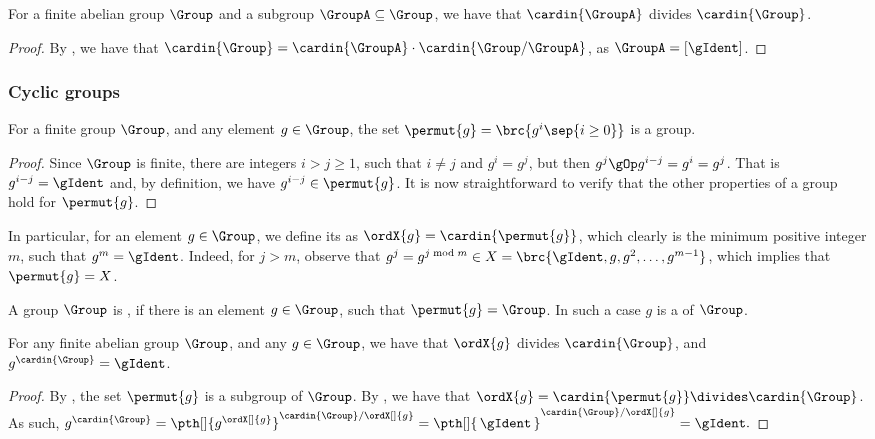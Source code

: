 
\begin{lemma}
    For a finite abelian group $\Group$ and a subgroup $\GroupA
    \subseteq \Group$, we have that $\cardin{\GroupA}$ divides
    $\cardin{\Group}$.
\end{lemma}

\begin{proof}
    By , we have that $\cardin{\Group} =
    \cardin{\GroupA} \cdot \cardin{\Group / \GroupA}$, as $\GroupA =
    [\gIdent]$.
\end{proof}

\subsubsection{Cyclic groups}

\begin{lemma}
    For a finite group $\Group$, and any element $g\in\Group$, 
    the set $\permut{g} = \brc{ g^i \sep{ i\geq 0}}$ is a group.
\end{lemma}

\begin{proof}
    Since $\Group$ is finite, there are integers $i > j\geq 1$, such
    that $i \neq j$ and $g^i = g^j$, but then $g^j\gOp g^{i-j} =g^i =
    g^j$. That is $g^{i-j} = \gIdent$ and, by definition, we have
    $g^{i-j} \in \permut{g}$. It is now straightforward to verify that
    the other properties of a group hold for $\permut{g}$.
\end{proof}


In particular, for an element $g \in \Group$, we define its
 as $\ordX{g} = \cardin{\bigl. \permut{g}}$, which
clearly is the minimum positive integer $m$, such that $g^m =
\gIdent$. Indeed, for $j > m$, observe that $g^j = g^{j \bmod m} \in X
= \brc{ \gIdent, g, g^2, \ldots, g^{m-1}}$, which implies that
$\permut{g} = X$.

A group $\Group$ is , if there is an element $g \in
\Group$, such that $\permut{g} = \Group$. In such a case $g$ is a
 of $\Group$.

\begin{lemma}
    For any finite abelian group $\Group$, and any $g \in \Group$, we
    have that $\ordX{g}$ divides $\cardin{\Group}$, and
    $g^{\cardin{\Group}} = \gIdent$.
\end{lemma}
\begin{proof}
    By , the set $\permut{g}$ is a subgroup
    of $\Group$. By , we have that $\ordX{g} =
    \cardin{\bigl. \permut{g}} \divides \cardin{\Group}$.
    As such, 
    \begin{math}
        g^{\cardin{\Group}}%
        =%
        \pth[]{g^{\ordX[]{g}}}^{\cardin{\Group} / \ordX[]{ g}}%
        =%
        \pth[]{\Bigl.\, \gIdent \,}^{\cardin{\Group} / \ordX[]{ g}}%
        =%
        \gIdent.
    \end{math}
\end{proof}

